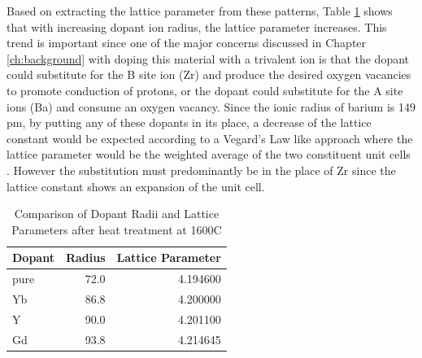 Based on extracting the lattice parameter from these patterns, Table \ref{tab:target:xrd:latticeConstant} shows that with increasing dopant ion radius, the lattice parameter increases. This trend is important since one of the major concerns discussed in Chapter \ref{ch:background} with doping this material with a trivalent ion is that the dopant could substitute for the B site ion (Zr) and produce the desired oxygen vacancies to promote conduction of protons, or the dopant could substitute for the A site ions (Ba) and consume an oxygen vacancy. Since the ionic radius of barium is 149 pm, by putting any of these dopants in its place, a decrease of the lattice constant would be expected according to a Vegard's Law like approach where the lattice parameter would be the weighted average of the two constituent unit cells \cite{Denton1991}. However the substitution must predominantly be in the place of Zr since the lattice constant shows an expansion of the unit cell. 

\begin{table}[b]
    \centering
    \caption{Comparison of Dopant Radii and Lattice Parameters after heat treatment at 1600\textdegree C}
    \begin{tabular}{lrr}
        \toprule
        Dopant &  Radius &  Lattice Parameter \\
        \midrule
        \midrule
          pure &    72.0 &          4.194600 \\
            Yb &    86.8 &          4.200000 \\
             Y &    90.0 &          4.201100 \\
            Gd &    93.8 &          4.214645 \\
        \bottomrule
        \end{tabular}
    \label{tab:target:xrd:latticeConstant}
\end{table}


